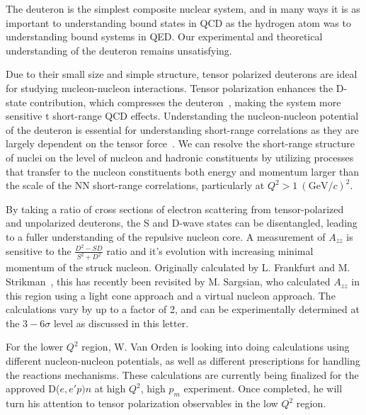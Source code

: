
The deuteron is the simplest composite nuclear system, and in many ways it is as important to understanding bound states in QCD as the hydrogen atom was to understanding bound systems in QED.  Our experimental and theoretical understanding of the deuteron remains unsatisfying. 

Due to their small size and simple structure, tensor polarized deuterons are ideal for studying nucleon-nucleon interactions. Tensor polarization enhances the D-state contribution, which compresses the deuteron~\cite{Forest:1996kp}, 
making the system more sensitive t short-range QCD effects. Understanding the nucleon-nucleon potential of the deuteron is essential for understanding short-range correlations as they are largely dependent on the tensor force~\cite{Arrington:2011xs}. We can resolve the short-range structure of nuclei on the level of nucleon and hadronic constituents by utilizing processes that transfer to the nucleon constituents both energy and momentum larger than the scale of the NN short-range correlations, particularly at $Q^2>1~(\mathrm{GeV}/c)^2$.


By taking a ratio of cross sections of electron scattering from tensor-polarized and unpolarized deuterons, the S and D-wave states can be disentangled, leading to a fuller understanding of the repulsive nucleon core. A measurement of $A_{zz}$ is sensitive to the $\frac{D^2-SD}{S^2+D^2}$ ratio and it's evolution with increasing minimal momentum of the struck nucleon. Originally calculated by L. Frankfurt and M. Strikman~\cite{Frankfurt:1988nt}, this has recently been revisited by M. Sargsian, who calculated $A_{zz}$ in this region using a light cone approach and a virtual nucleon approach. The calculations vary by up to a factor of 2, and can be experimentally determined at the $3-6\sigma$ level as discussed in this letter.



For the lower $Q^2$ region, W. Van Orden is looking into doing calculations using different nucleon-nucleon potentials, as well as different prescriptions for handling the reactions mechanisms.   These calculations are currently being finalized for the approved
D($e,e'p)n$ at high $Q^2$, high $p_m$ experiment. Once completed, he will turn his attention to tensor polarization observables in the low $Q^2$ region.

